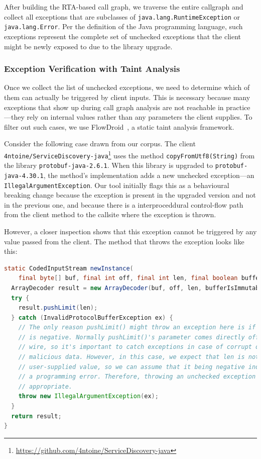 After building the RTA-based call graph, we traverse the entire callgraph and collect all exceptions that are subclasses of \texttt{java.lang.RuntimeException} or \texttt{java.lang.Error}. Per the definition of the Java programming language, such exceptions represent the complete set of unchecked exceptions that the client might be newly exposed to due to the library upgrade.

\subsubsection{Exception Verification with Taint Analysis}

Once we collect the list of unchecked exceptions, we need to determine which of them can actually be triggered by client inputs. This is necessary because many exceptions that show up during call graph analysis are not reachable in practice—they rely on internal values rather than any parameters the client supplies. To filter out such cases, we use FlowDroid~\cite{Arzt14:_flowdroid}, a static taint analysis framework.

Consider the following case drawn from our corpus. The client \texttt{4ntoine/ServiceDiscovery-java}\footnote{\url{https://github.com/4ntoine/ServiceDiscovery-java}} uses the method \texttt{copyFromUtf8(String)} from the library \texttt{protobuf-java-2.6.1}. When this library is upgraded to \texttt{protobuf-java-4.30.1}, the method's implementation adds a new unchecked exception—an \texttt{IllegalArgumentException}. Our tool initially flags this as a behavioural breaking change because the exception is present in the upgraded version and not in the previous one, and because there is a interproceddural control-flow path from the client method to the callsite where the exception is thrown.

However, a closer inspection shows that this exception cannot be triggered by any value passed from the client. The method that throws the exception looks like this:

\begin{lstlisting}[language=Java,breaklines=true,basicstyle=\scriptsize\ttfamily]
static CodedInputStream newInstance(
    final byte[] buf, final int off, final int len, final boolean bufferIsImmutable) {
  ArrayDecoder result = new ArrayDecoder(buf, off, len, bufferIsImmutable);
  try {
    result.pushLimit(len);
  } catch (InvalidProtocolBufferException ex) {
    // The only reason pushLimit() might throw an exception here is if len
    // is negative. Normally pushLimit()'s parameter comes directly off the
    // wire, so it's important to catch exceptions in case of corrupt or
    // malicious data. However, in this case, we expect that len is not a
    // user-supplied value, so we can assume that it being negative indicates
    // a programming error. Therefore, throwing an unchecked exception is
    // appropriate.
    throw new IllegalArgumentException(ex);
  }
  return result;
}
\end{lstlisting}

